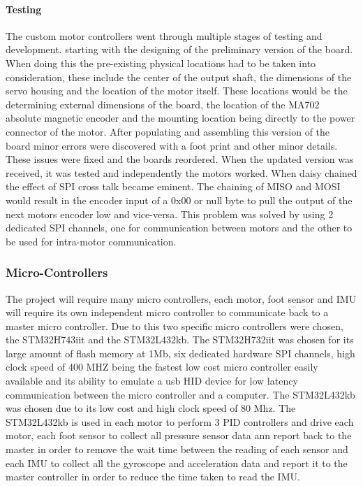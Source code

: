         \paragraph{Testing} 
        The custom motor controllers went through multiple stages of testing and development. starting with the designing of the preliminary version of the board. When doing this the pre-existing physical locations had to be taken into consideration, these include the center of the output shaft, the dimensions of the servo housing and the location of the motor itself. These locations would be the determining external dimensions of the board, the location of the MA702 absolute magnetic encoder and the mounting location being directly to the power connector of the motor. After populating and assembling this version of the board minor errors were discovered with a foot print and other minor details. These issues were fixed and the boards reordered. When the updated version was received, it was tested and independently the motors worked. When daisy chained the effect of SPI cross talk became eminent. The chaining of MISO and MOSI would result in the encoder input of a 0x00 or null byte to pull the output of the next motors encoder low and vice-versa. This problem was solved by using 2 dedicated SPI channels, one for communication between motors and the other to be used for intra-motor communication. 

        \subsubsection{Micro-Controllers}
            The project will require many micro controllers, each motor, foot sensor and IMU will require its own independent micro controller to communicate back to a master micro controller. Due to this two specific micro controllers were chosen, the STM32H743iit\cite{STM32H43IIT} and the STM32L432kb\cite{STM32l432KB}. The STM32H732iit was chosen for its large amount of flash memory at 1Mb, six dedicated hardware SPI channels, high clock speed of 400 MHZ being the fastest low cost micro controller easily available and its ability to emulate a usb HID device for low latency communication between the micro controller and a computer. The STM32L432kb was chosen due to its low cost and high clock speed of 80 Mhz. The STM32L432kb is used in each motor to perform 3 PID controllers and drive each motor, each foot sensor to collect all pressure sensor data ann report back to the master in order to remove the wait time between the reading of each sensor and each IMU to collect all the gyroscope and acceleration data and report it to the master controller in order to reduce the time taken to read the IMU. 
            

